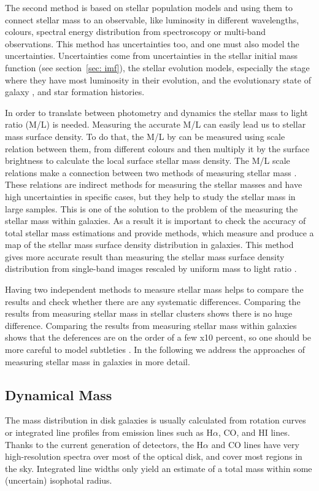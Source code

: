 The second method is based on stellar population models \citep[e.g.][]{ Bruzual93, Kotulla09} and using them to connect stellar mass to an observable, like luminosity in different wavelengths, colours, spectral energy distribution from spectroscopy or multi-band observations. This method has uncertainties too, and one must also model the uncertainties. Uncertainties come from uncertainties in the stellar initial mass function (see section{~\ref{sec: imf}}), the stellar evolution models, especially the stage where they have most luminosity in their evolution, and the evolutionary state of galaxy \citep[see,][]{Dalcanton12}, and star formation histories. 

In order to translate between photometry and dynamics the stellar mass to light ratio (M/L) is needed. Measuring the accurate M/L can easily lead us to stellar mass surface density.  To do that, the M/L by can be measured using scale relation between them, from different colours and then multiply it by the surface brightness to calculate the local surface stellar mass density. The M/L scale relations make a connection between two methods of measuring stellar mass \citep{Bell03}. These relations are indirect methods for measuring the stellar masses and have high uncertainties in specific cases, but they help to study the stellar mass in large samples. This is one of the solution to the problem of the measuring the stellar mass within galaxies. As a result it is important to check the accuracy of total stellar mass estimations and provide methods, which measure and produce a map of the stellar mass surface density distribution in galaxies. This method gives more accurate result than measuring the stellar mass surface density distribution from single-band images rescaled by uniform mass to light ratio \cite{Zibetti09}.
 
Having two independent methods to measure stellar mass helps to compare the results and check whether there are any systematic differences. Comparing the results from measuring stellar mass in stellar clusters shows there is no huge difference. Comparing the results from measuring stellar mass within galaxies shows that the deferences are on the order of a few x10 percent, so one should be more careful to model subtleties \citep{McLaughlin05}. In the following we address the approaches of measuring stellar mass in galaxies in more detail.

\subsection{Dynamical Mass}
The mass distribution in disk galaxies is usually calculated from rotation curves or integrated line profiles from emission lines such as H${\alpha}$, CO, and HI lines. Thanks to the current generation of detectors, the H$\alpha$ and CO lines have very high-resolution spectra over most of the optical disk, and cover most regions in the sky. Integrated line widths only yield an estimate of a total mass within some (uncertain) isophotal radius.

